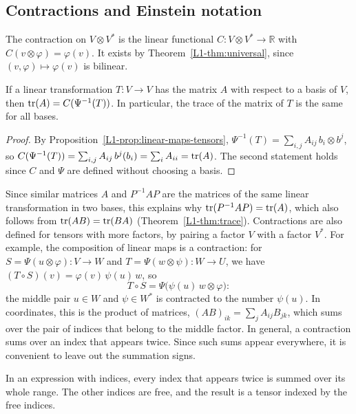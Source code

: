 \subsection{Contractions and Einstein notation}

\begin{definition}[Contraction]\label{L1-def:contraction}
    The contraction on $V \otimes V^*$ is the linear functional $C: V \otimes V^* \to \mathbb{R}$ with $C(v \otimes \varphi) = \varphi(v)$. It exists by Theorem~\ref{L1-thm:universal}, since $(v, \varphi) \mapsto \varphi(v)$ is bilinear.
\end{definition}

\begin{proposition}\label{L1-prop:trace-contraction}
    If a linear transformation $T: V \to V$ has the matrix $A$ with respect to a basis of $V$, then $\operatorname{tr}(A) = C(\Psi^{-1}(T))$. In particular, the trace of the matrix of $T$ is the same for all bases.
\end{proposition}

\begin{proof}
    By Proposition~\ref{L1-prop:linear-maps-tensors}, $\Psi^{-1}(T) = \sum_{i,j} A_{ij}\, b_i \otimes b^j$, so $C(\Psi^{-1}(T)) = \sum_{i,j} A_{ij}\, b^j(b_i) = \sum_i A_{ii} = \operatorname{tr}(A)$. The second statement holds since $C$ and $\Psi$ are defined without choosing a basis.
\end{proof}

Since similar matrices $A$ and $P^{-1}AP$ are the matrices of the same linear transformation in two bases, this explains why $\operatorname{tr}(P^{-1}AP) = \operatorname{tr}(A)$, which also follows from $\operatorname{tr}(AB) = \operatorname{tr}(BA)$ (Theorem~\ref{L1-thm:trace}). Contractions are also defined for tensors with more factors, by pairing a factor $V$ with a factor $V^*$. For example, the composition of linear maps is a contraction: for $S = \Psi(u \otimes \varphi): V \to W$ and $T = \Psi(w \otimes \psi): W \to U$, we have $(T \circ S)(v) = \varphi(v)\,\psi(u)\,w$, so
\[T \circ S = \Psi\big(\psi(u)\, w \otimes \varphi\big):\]
the middle pair $u \in W$ and $\psi \in W^*$ is contracted to the number $\psi(u)$. In coordinates, this is the product of matrices, $(AB)_{ik} = \sum_j A_{ij}B_{jk}$, which sums over the pair of indices that belong to the middle factor. In general, a contraction sums over an index that appears twice. Since such sums appear everywhere, it is convenient to leave out the summation signs.

\begin{definition}
    In an expression with indices, every index that appears twice is summed over its whole range. The other indices are free, and the result is a tensor indexed by the free indices.
\end{definition}


